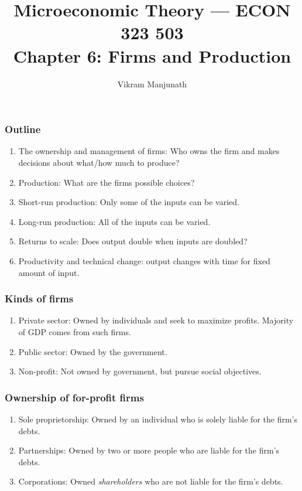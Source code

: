 \documentclass[xcolor=pdftex,dvipsnames]{beamer}
\title{Microeconomic Theory --- ECON 323 503 \\ Chapter 6: Firms and Production}
\author{Vikram Manjunath}
\institute{Texas A\&M University}
\begin{document}
\maketitle

\begin{frame}
\frametitle{Outline}
\begin{enumerate}[<+->]
\item The ownership and management of firms: Who owns the firm and
  makes decisions about what/how much to produce?
\item Production: What are the firms possible choices?
\item Short-run production: Only some of the inputs can be varied. 
\item Long-run production: All of the inputs can be varied.
\item Returns to scale: Does output double when inputs are doubled?
\item Productivity and technical change: output changes with
  time for fixed amount of input.
\end{enumerate}
\end{frame}

\begin{frame}
\frametitle{Kinds of firms}
\begin{enumerate}[<+->]
\item Private sector: Owned by individuals and seek to maximize
  profits. Majority of GDP comes from such firms.
\item Public sector: Owned by the government. 
\item Non-profit: Not owned by government, but pursue social objectives.
\end{enumerate}
\end{frame}


\begin{frame}
\frametitle{Ownership of for-profit firms}
\begin{enumerate}
[<+->]
\item Sole proprietorship: Owned by an individual who is solely
  liable for the firm's debts.
\item Partnerships: Owned by two or more people who are liable for the
  firm's debts.
\item Corporations: Owned \emph{shareholders} who are not liable for
  the firm's debts.
\end{enumerate}

\end{frame}
\end{document}
